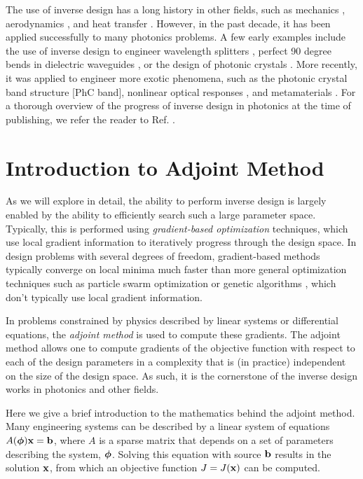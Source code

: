 The use of inverse design has a long history in other fields, such as mechanics \cite{tanaka_inverse_1998}, aerodynamics \cite{jameson_aerodynamic_nodate}, and heat transfer \cite{ozisik_inverse_2018}.
However, in the past decade, it has been applied successfully to many photonics problems.
A few early examples include the use of inverse design to engineer wavelength splitters \cite{piggott_inverse_2015,kingma_adam:_2014}, perfect 90 degree bends in dielectric waveguides \cite{jensen_topology_2005}, or the design of photonic crystals \cite{borel_topology_2004}.
More recently, it was applied to engineer more exotic phenomena, such as the photonic crystal band structure [PhC band], nonlinear optical responses \cite{lin_cavity-enhanced_2016}, and metamaterials \cite{sigmund_systematic_2009}.
For a thorough overview of the progress of inverse design in photonics at the time of publishing, we refer the reader to Ref. .

\section{Introduction to Adjoint Method}

As we will explore in detail, the ability to perform inverse design is largely enabled by the ability to efficiently search such a large parameter space.
Typically, this is performed using \textit{gradient-based optimization} techniques, which use local gradient information to iteratively progress through the design space.
In design problems with several degrees of freedom, gradient-based methods typically converge on local minima much faster than more general optimization techniques such as particle swarm optimization \cite{noauthor_particle_nodate} or genetic algorithms \cite{whitley_genetic_1994}, which don't typically use local gradient information.

In problems constrained by physics described by linear systems or differential equations, the \textit{adjoint method} is used to compute these gradients.
The adjoint method allows one to compute gradients of the objective function with respect to each of the design parameters in a complexity that is (in practice) independent on the size of the design space.
As such, it is the cornerstone of the inverse design works in photonics and other fields.

Here we give a brief introduction to the mathematics behind the adjoint method.
Many engineering systems can be described by a linear system of equations $A(\bm{\phi}) \mathbf{x} = \mathbf{b}$, where $A$ is a sparse matrix that depends on a set of parameters describing the system, $\bm{\phi}$.
Solving this equation with source $\mathbf{b}$ results in the solution $\mathbf{x}$, from which an objective function $J=J(\mathbf{x})$ can be computed.

